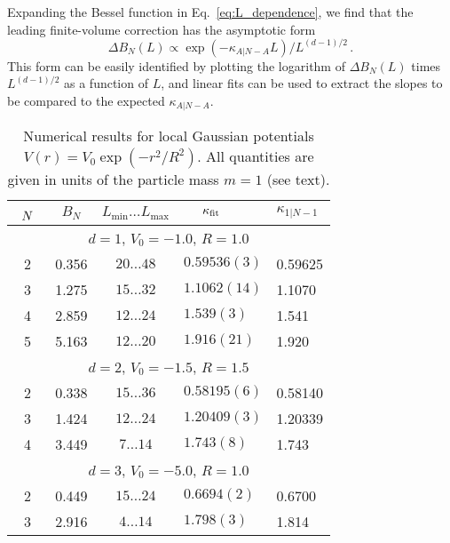 \documentclass[aps,singlecolumn,superscriptaddress,nofootinbib,tightenlines,
preprintnumbers,showkeys]{revtex4-1}
\begin{document}
Expanding the Bessel function in Eq.~\eqref{eq:L_dependence}, we find that
the leading finite-volume correction has the asymptotic form
%
\begin{equation}
 \Delta B_N(L) \propto \exp\left({-}\kappa_{A|N-A}L\right) / L^{(d-1)/2} \,.
\label{eq:DeltaB-ND}
\end{equation}
%
This form can be easily identified by plotting the logarithm of $\Delta B_N(L)$
times $L^{(d-1)/2}$ as a function of $L$, and linear fits can be used to
extract the slopes to be compared to the expected $\kappa_{A|N{-}A}$.
%
\begin{table}[htbp]
\centering
\begin{tabular}{cccll}
\hline\hline
$\rule{0pt}{1.2em}\phantom{x}N\phantom{x}$
& $B_N$
& $L_{\text{min}} \ldots L_{\text{max}}$
& $\hspace{1.5em}\kappa_{\text{fit}}$ 
& $\kappa_{1|N-1}$ \\
\hline\hline
\multicolumn{5}{c}{\rule{0pt}{1.2em}
$d=1$, $V_0 = {-}1.0$, $R = 1.0$} \\
\hline
\rule{0pt}{1.2em}%
2 & 0.356 & $20\ldots48$ & $0.59536(3)$ & 0.59625 \\
3 & 1.275 & $15\ldots32$ & $1.1062(14)$ & 1.1070 \\
4 & 2.859 & $12\ldots24$ & $1.539(3)$   & 1.541 \\
5 & 5.163 & $12\ldots20$ & $1.916(21)$  & 1.920 \\
\hline\hline
\multicolumn{5}{c}{\rule{0pt}{1.2em}
$d=2$, $V_0 = {-}1.5$, $R = 1.5$} \\
\hline
\rule{0pt}{1.2em}%
2 & 0.338 & $15\ldots36$ & $0.58195(6)$ & 0.58140 \\
3 & 1.424 & $12\ldots24$ & $1.20409(3)$ & 1.20339 \\
4 & 3.449 & $7\ldots14$  & $1.743(8)$    & 1.743 \\
\hline\hline
\multicolumn{5}{c}{\rule{0pt}{1.2em}
$d=3$, $V_0 = {-}5.0$, $R=1.0$} \\
\hline
\rule{0pt}{1.2em}%
2 & 0.449 & $15\ldots24$ & $0.6694(2)$ & 0.6700 \\
3 & 2.916 & $4\ldots14$ & $1.798(3)$ & 1.814 \\
\hline\hline
\end{tabular}
\caption{Numerical results for local Gaussian potentials $V(r) = 
V_0\exp(-r^2/R^2)$.  All quantities are given in units of the particle mass 
$m=1$ (see text).}
\label{tab:Results-Gauss}
\end{table}
\end{document}
